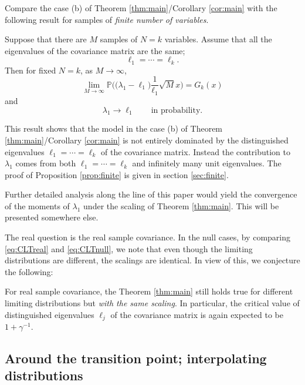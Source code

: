 \documentclass[11pt]{article}
\begin{document}
Compare the case (b) of Theorem \ref{thm:main}/Corollary
\ref{cor:main} with the following result for samples of
\emph{finite number of variables}.

\begin{prop}\label{prop:finite}
Suppose that there are $M$ samples of $N=k$ variables. Assume that
all the eigenvalues of the covariance matrix are the same;
\begin{equation}
  \ell_1=\cdots=\ell_k.
\end{equation}
Then for fixed $N=k$, as $M\to\infty$,
\begin{equation}
  \lim_{M\to\infty} \mathbb{P} \biggl( \bigl(\lambda_1-\ell_1
  \bigr) \frac1{\ell_1}\sqrt{M} x\biggr) = G_k(x)
\end{equation}
and
\begin{equation}\label{eq:finiteinprob}
  \lambda_1 \to \ell_1 \qquad \text{in probability.}
\end{equation}
\end{prop}

This result shows that the model in the case (b) of Theorem
\ref{thm:main}/Corollary \ref{cor:main} is not entirely dominated
by the distinguished eigenvalues $\ell_1=\cdots=\ell_k$ of the
covariance matrix. Instead the contribution to $\lambda_1$ comes
from both $\ell_1= \cdots=\ell_k$ and infinitely many unit
eigenvalues. The proof of Proposition \ref{prop:finite} is given
in section \ref{sec:finite}.

 Further detailed analysis along the line of this
paper would yield the convergence of the moments of $\lambda_1$
under the scaling of Theorem \ref{thm:main}. This will be
presented somewhere else.

\bigskip

The real question is the real sample covariance. In the null
cases, by comparing \eqref{eq:CLTreal} and \eqref{eq:CLTnull}, we
note that even though the limiting distributions are different,
the scalings are identical. In view of this, we conjecture the
following:

\begin{Conjecture} For real sample covariance, the
Theorem \ref{thm:main} still holds true for different limiting
distributions but \emph{with the same scaling}. In particular, the
critical value of distinguished eigenvalues $\ell_j$ of the
covariance matrix is again expected to be $1+\gamma^{-1}$.
\end{Conjecture}


\subsection{Around the transition point; interpolating distributions}
\end{document}
